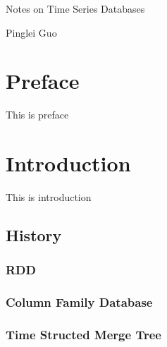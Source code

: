 \documentclass[12pt,a4paper,oneside]{book}
\author{Pinglei Guo}
\date{\today}
\begin{document}
\centerline{\Large{Notes on Time Series Databases}}
\centerline{Pinglei Guo}
\clearpage

\chapter*{Preface}

This is preface

\tableofcontents
\clearpage

\chapter{Introduction}

This is introduction

\section{History}

\subsection{RDD}

\subsection{Column Family Database}

\subsection{Time Structed Merge Tree}
\end{document}
